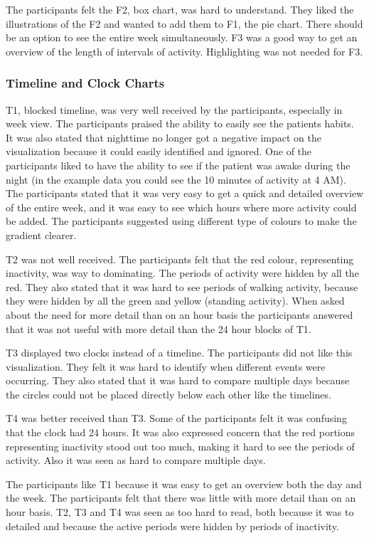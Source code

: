 The participants felt the F2, box chart, was hard to understand. They liked the illustrations of the F2 and wanted to add them to F1, the pie chart. There should be an option to see the entire week simultaneously. F3 was a good way to get an overview of the length of intervals of activity. Highlighting was not needed for F3.

\subsubsection{Timeline and Clock Charts}
T1, blocked timeline, was very well received by the participants, especially in week view. The participants praised the ability to easily see the patients habits. It was also stated that nighttime no longer got a negative impact on the visualization because it could easily identified and ignored. One of the participants liked to have the ability to see if the patient was awake during the night (in the example data you could see the 10 minutes of activity at 4 AM). The participants stated that it was very easy to get a quick and detailed overview of the entire week, and it was easy to see which hours where more activity could be added. The participants suggested using different type of colours to make the gradient clearer.

T2 was not well received. The participants felt that the red colour, representing inactivity, was way to dominating. The periods of activity were hidden by all the red. They also stated that it was hard to see periods of walking activity, because they were hidden by all the green and yellow (standing activity). When asked about the need for more detail than on an hour basis the participants answered that it was not useful with more detail than the 24 hour blocks of T1.

T3 displayed two clocks instead of a timeline. The participants did not like this visualization. They felt it was hard to identify when different events were occurring. They also stated that it was hard to compare multiple days because the circles could not be placed directly below each other like the timelines.

T4 was better received than T3. Some of the participants felt it was confusing that the clock had 24 hours. It was also expressed concern that the red portions representing inactivity stood out too much, making it hard to see the periods of activity. Also it was seen as hard to compare multiple days.

The participants like T1 because it was easy to get an overview both the day and the week. The participants felt that there was little with more detail than on an hour basis. T2, T3 and T4 was seen as too hard to read, both because it was to detailed and because the active periods were hidden by periods of inactivity.

